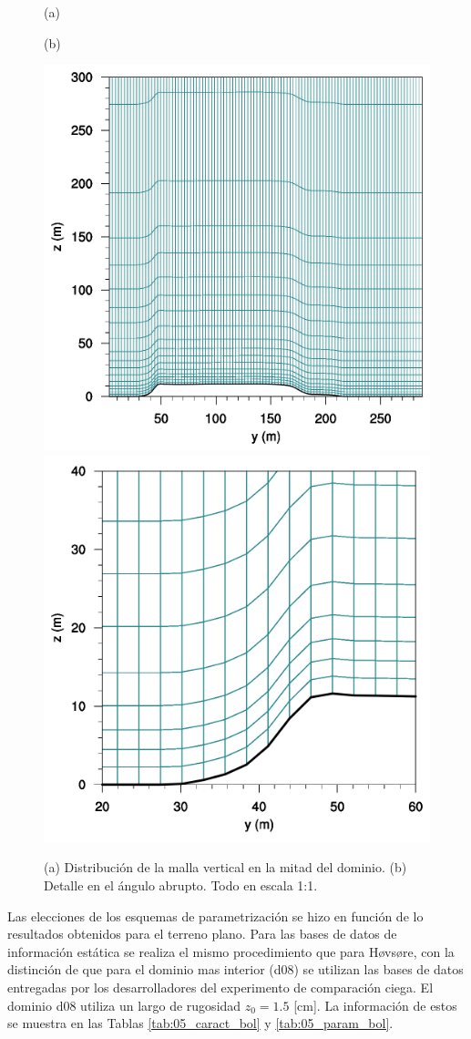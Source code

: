 \begin{figure}[H]
	\centering
	\begin{minipage}{0.5\linewidth}
		\center\hspace{1.8cm}(a)
	\end{minipage}%
	\begin{minipage}{0.5\linewidth}
		\center(b)
	\end{minipage}%
	
	\includegraphics[width=0.45\linewidth,trim={0cm 0cm -0cm 0cm},clip]{Imagenes/05/mesh_y50}%
	\includegraphics[width=0.45\linewidth,trim={0cm 0cm 0cm 0cm},clip]{Imagenes/05/hd_mesh_50}%
	
	\caption{(a) Distribución de la malla vertical en la mitad del dominio. (b) Detalle en el ángulo abrupto. Todo en escala 1:1.}
	\label{fig:05_mesh_bol}
\end{figure}

\newpage
Las elecciones de los esquemas de parametrización se hizo en función de lo resultados obtenidos para el terreno plano. Para las bases de datos de información estática se realiza el mismo procedimiento que para Høvsøre, con la distinción de que para el dominio mas interior (d08) se utilizan las bases de datos entregadas por los desarrolladores del experimento de comparación ciega. El dominio d08 utiliza un largo de rugosidad $z_0=1.5$ [cm]. La información de estos se muestra en las Tablas \ref{tab:05_caract_bol} y \ref{tab:05_param_bol}.

